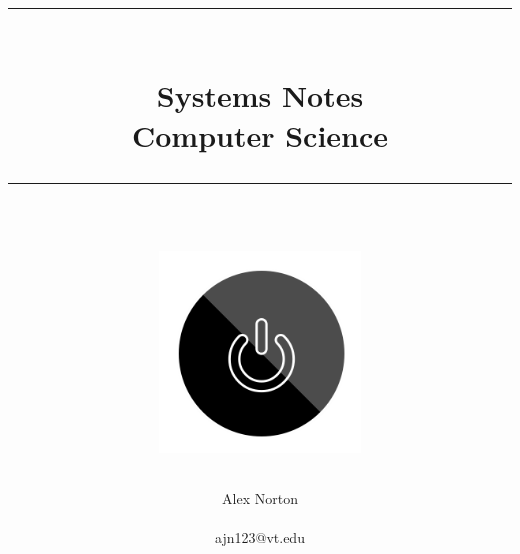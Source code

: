 \documentclass[15pt,idxtotoc,hyperref,openany]{labbook} %
\newcommand{\HRule}{\rule{\linewidth}{0.5mm}} %
\begin{document}

\frontmatter %
\title{
\begin{center}
\HRule \\[0.4cm]
{\Huge \bfseries Systems Notes \\[0.5cm] \Large Computer Science}\\[0.4cm] %
\HRule \\[1.5cm]
\includegraphics[width=0.40\textwidth]{./power.png}
\end{center}
}
\author{\Huge Alex Norton\\ \\ \LARGE ajn123@vt.edu \\[2cm]} %
\maketitle

\tableofcontents

\mainmatter %










\end{document}
